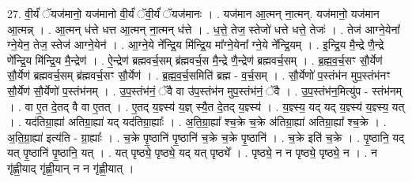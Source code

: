 \documentclass[17pt]{extarticle}
\begin{document}
27. वी॒र्यं॑ ॅयज॑मानो॒ यज॑मानो वी॒र्यं॑ ॅवी॒र्यं॑ ॅयज॑मानः । . यज॑मान आ॒त्मन् ना॒त्मन्. यज॑मानो॒ यज॑मान आ॒त्मन्न् । . आ॒त्मन् ध॑त्ते धत्त आ॒त्मन् ना॒त्मन् ध॑त्ते । . ध॒त्ते॒ तेज॒ स्तेजो॑ धत्ते धत्ते॒ तेजः॑ । . तेज॑ आग्ने॒येना᳚ ग्ने॒येन॒ तेज॒ स्तेज॑ आग्ने॒येन॑ । . आ॒ग्ने॒ये ने᳚न्द्रि॒य मि॑न्द्रि॒य मा᳚ग्ने॒येना᳚ ग्ने॒ये ने᳚न्द्रि॒यम् । . इ॒न्द्रि॒य मै॒न्द्रे णै॒न्द्रे णे᳚न्द्रि॒य मि॑न्द्रि॒य मै॒न्द्रेण॑ । . ऐ॒न्द्रेण॑ ब्रह्मवर्च॒सम् ब्र॑ह्मवर्च॒स मै॒न्द्रे णै॒न्द्रेण॑ ब्रह्मवर्च॒सम् । . ब्र॒ह्म॒व॒र्च॒सꣳ सौ॒र्येण॑ सौ॒र्येण॑ ब्रह्मवर्च॒सम् ब्र॑ह्मवर्च॒सꣳ सौ॒र्येण॑ । . ब्र॒ह्म॒व॒र्च॒समिति॑ ब्रह्म - व॒र्च॒सम् । . सौ॒र्येणो॑ प॒स्तंभ॑न मुप॒स्तंभ॑नꣳ सौ॒र्येण॑ सौ॒र्येणो॑ प॒स्तंभ॑नम् । . उ॒प॒स्तंभ॑नं॒ ॅवै वा उ॑प॒स्तंभ॑न मुप॒स्तंभ॑नं॒ ॅवै । . उ॒प॒स्तंभ॑न॒मित्यु॑प - स्तंभ॑नम् । . वा ए॒त दे॒तद् वै वा ए॒तत् । . ए॒तद् य॒ज्ञ्स्य॑ य॒ज्ञ् स्यै॒त दे॒तद् य॒ज्ञ्स्य॑ । . य॒ज्ञ्स्य॒ यद् यद् य॒ज्ञ्स्य॑ य॒ज्ञ्स्य॒ यत् । . यद॑तिग्रा॒ह्या॑ अतिग्रा॒ह्या॑ यद् यद॑तिग्रा॒ह्याः᳚ । . अ॒ति॒ग्रा॒ह्या᳚ श्च॒क्रे च॒क्रे अ॑तिग्रा॒ह्या॑ अतिग्रा॒ह्या᳚ श्च॒क्रे । . अ॒ति॒ग्रा॒ह्या॑ इत्य॑ति - ग्रा॒ह्याः᳚ । . च॒क्रे पृ॒ष्ठानि॑ पृ॒ष्ठानि॑ च॒क्रे च॒क्रे पृ॒ष्ठानि॑ । . च॒क्रे इति॑ च॒क्रे । . पृ॒ष्ठानि॒ यद् यत् पृ॒ष्ठानि॑ पृ॒ष्ठानि॒ यत् । . यत् पृष्ठ्ये॒ पृष्ठ्ये॒ यद् यत् पृष्ठ्ये᳚ । . पृष्ठ्ये॒ न न पृष्ठ्ये॒ पृष्ठ्ये॒ न । . न गृ॑ह्णी॒याद् गृ॑ह्णी॒यान् न न गृ॑ह्णी॒यात् । \newline
\end{document}

